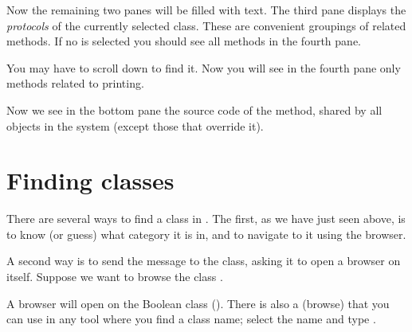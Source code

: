 \documentclass[a4paper,10pt,twoside]{book}
\begin{document}
Now the remaining two panes will be filled with text.
The third pane displays the \emph{protocols} of the currently selected class.
These are convenient groupings of related methods.
If no  is selected you should see all methods in the fourth pane.

You may have to scroll down to find it.
Now you will see in the fourth pane only methods related to printing.

Now we see in the bottom pane the source code of the  method, shared by all objects in the system (except those that override it).

\section{Finding classes}

There are several ways to find a class in \sq.  The first, as we have just seen above, is to know (or guess) what category it is in, and to navigate to it using the browser.

A second way is to send the  message to the class, asking it to open a browser on itself.  Suppose we want to browse the class .

A browser will open on the Boolean class ().
There is also a   (browse) that you can use in any tool where you find a class name;
select the name and type .

\end{document}
